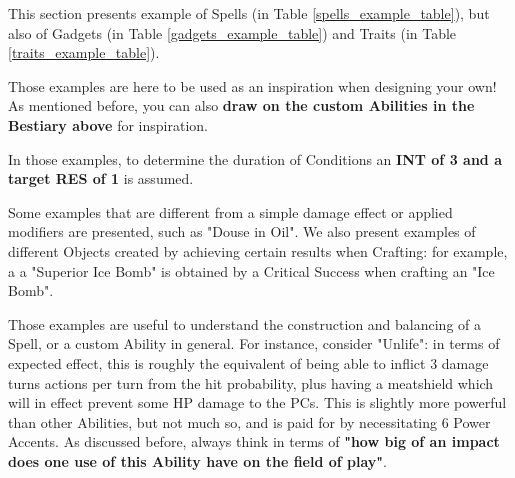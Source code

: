 \label{examples}

This section presents example of Spells (in Table \ref{spells_example_table}), but also of Gadgets (in Table \ref{gadgets_example_table}) and Traits (in Table \ref{traits_example_table}). 


\begin{rpg-examplebox}


Those examples are here to be used as an inspiration when designing your own! As mentioned before, you can also \textbf{draw on the custom Abilities in the Bestiary above} for inspiration.
\end{rpg-examplebox}


In those examples, to determine the duration of Conditions an \textbf{INT of 3 and a target RES of 1} is assumed.

Some examples that are different from a simple damage effect or applied modifiers are presented, such as "Douse in Oil". We also present examples of different Objects created by achieving certain results when Crafting: for example, a a "Superior Ice Bomb" is obtained by a Critical Success when crafting an "Ice Bomb".

Those examples are useful to understand the construction and balancing of a Spell, or a custom Ability in general. For instance, consider "Unlife": in terms of expected effect, this is roughly the equivalent of being able to inflict 3 damage  turns  actions per turn  from the hit probability, plus having a meatshield which will in effect prevent some HP damage to the PCs. This is slightly more powerful than other Abilities, but not much so, and is paid for by necessitating 6 Power Accents. As discussed before, always think in terms of \textbf{"how big of an impact does one use of this Ability have on the field of play"}.


